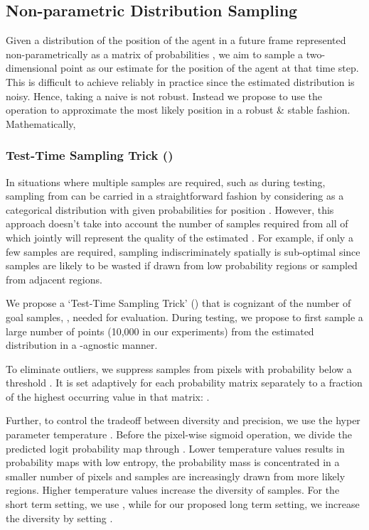 \documentclass[final]{cvpr}
\begin{document}
\subsection{Non-parametric Distribution Sampling}
\label{sec:sampling}
Given a distribution  of the position of the agent in a future frame represented non-parametrically as a matrix of probabilities , 
we aim to sample a two-dimensional point as our estimate for the position of the agent at that time step. This is difficult to achieve reliably in practice since the estimated distribution  is noisy. Hence, taking a naive  is not robust. Instead we propose to use the  operation \cite{goodfellow20166} to approximate the most likely position in a robust \& stable fashion. Mathematically,  



\subsubsection{Test-Time Sampling Trick ()} 
In situations where multiple samples are required, such as during testing, sampling from  can be carried in a straightforward fashion by considering  as a categorical distribution with given probabilities  for position . However, this approach doesn't take into account the number of samples required from  all of which jointly will represent the quality of the estimated . For example, if only a few samples are required, sampling indiscriminately spatially is sub-optimal since samples are likely to be wasted if drawn from low probability regions or sampled from adjacent regions.

We propose a `Test-Time Sampling Trick' () that is cognizant of the number of goal samples, , needed for evaluation. During testing, we propose to first sample a large number of points (10,000 in our experiments) from the estimated distribution  in a -agnostic manner. 

To eliminate outliers, we suppress samples from pixels  with probability  below a threshold . It is set adaptively for each probability matrix  separately to a fraction of the highest occurring value in that matrix: . 

Further, to control the tradeoff between diversity and precision, we use the hyper parameter temperature . Before the pixel-wise sigmoid operation, we divide the predicted logit probability map through . Lower temperature values results in probability maps  with low entropy, \ie the probability mass is concentrated in a smaller number of pixels and samples are increasingly drawn from more likely regions. Higher temperature values increase the diversity of samples. For the short term setting, we use , while for our proposed long term setting, we increase the diversity by setting .
\end{document}
